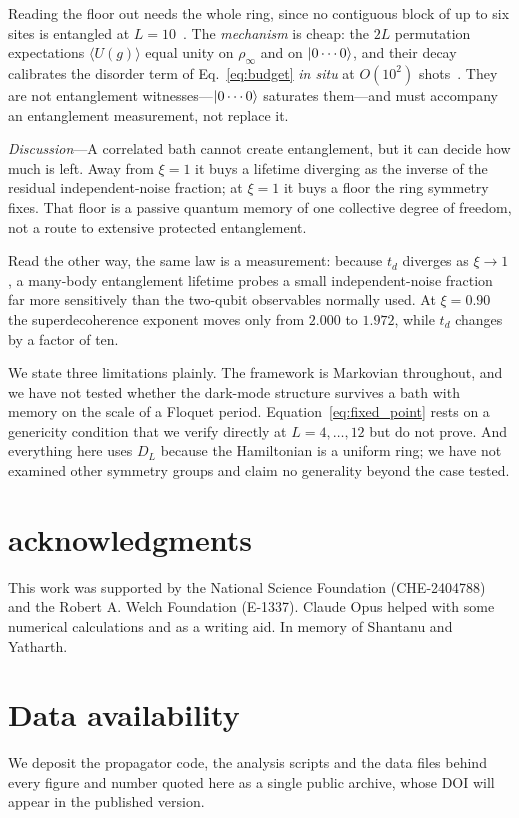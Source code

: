 \documentclass[aps,prl,reprint,amsmath,amssymb,floatfix]{revtex4-2}
\begin{document}
Reading the floor out needs the whole ring, since no contiguous block of up to
six sites is entangled at $L=10$~\cite{SM}. The \emph{mechanism} is cheap: the
$2L$ permutation expectations $\langle U(g)\rangle$ equal unity on
$\rho_\infty$ and on $\ket{0\cdots0}$, and their decay calibrates the disorder
term of Eq.~\eqref{eq:budget} \emph{in situ} at $O(10^2)$ shots~\cite{SM}.
They are not entanglement witnesses---$\ket{0\cdots0}$ saturates them---and
must accompany an entanglement measurement, not replace it.

{\it Discussion}---A correlated bath cannot create entanglement, but it can
decide how much is left. Away from $\xi=1$ it buys a lifetime diverging as the
inverse of the residual independent-noise fraction; at $\xi=1$ it buys a floor
the ring symmetry fixes. That floor is a passive quantum memory of one
collective degree of freedom, not a route to extensive protected
entanglement.

Read the other way, the same law is a measurement: because $t_d$ diverges as
$\xi\to1$, a many-body entanglement lifetime probes a small independent-noise
fraction far more sensitively than the two-qubit observables normally used. At
$\xi=0.90$ the superdecoherence exponent moves only from $2.000$ to $1.972$,
while $t_d$ changes by a factor of ten.

We state three limitations plainly. The framework is Markovian
throughout, and we have not tested whether the dark-mode structure survives a
bath with memory on the scale of a Floquet period.
Equation~\eqref{eq:fixed_point} rests on a genericity condition that we verify
directly at $L=4,\dots,12$ but do not prove. And everything here uses $D_L$
because the Hamiltonian is a uniform ring; we have not examined other symmetry
groups and claim no generality beyond the case tested.

\section*{acknowledgments}
This work was supported by the National Science Foundation (CHE-2404788) and
the Robert A. Welch Foundation (E-1337). Claude Opus helped with some numerical calculations and as a writing aid. In memory of Shantanu and Yatharth. 


\section*{Data availability}
We deposit the propagator code, the analysis scripts and the data files
behind every figure and number quoted here as a single public archive, whose
DOI will appear in the published version.
\end{document}

